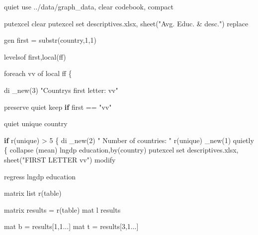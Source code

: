 \documentclass[
  12pt,
]{article}
\newenvironment{Shaded}{\begin{snugshade}}{\end{snugshade}}
\newcommand{\ControlFlowTok}[1]{\textcolor[rgb]{0.13,0.29,0.53}{\textbf{#1}}}
\newcommand{\DecValTok}[1]{\textcolor[rgb]{0.00,0.00,0.81}{#1}}
\newcommand{\FunctionTok}[1]{\textcolor[rgb]{0.00,0.00,0.00}{#1}}
\newcommand{\NormalTok}[1]{#1}
\newcommand{\OtherTok}[1]{\textcolor[rgb]{0.56,0.35,0.01}{#1}}
\newcommand{\SpecialCharTok}[1]{\textcolor[rgb]{0.00,0.00,0.00}{#1}}
\newcommand{\StringTok}[1]{\textcolor[rgb]{0.31,0.60,0.02}{#1}}
\begin{document}
\begin{Shaded}
\begin{Highlighting}[]
\NormalTok{quiet use ..}\SpecialCharTok{/}\NormalTok{data}\SpecialCharTok{/}\NormalTok{graph\_data, clear}
\NormalTok{    codebook, compact}

\NormalTok{            putexcel clear}
\NormalTok{            putexcel set descriptives.xlsx, }\FunctionTok{sheet}\NormalTok{(}\StringTok{"Avg. Educ. \& desc."}\NormalTok{) replace}
            

\NormalTok{gen first }\OtherTok{=} \FunctionTok{substr}\NormalTok{(country,}\DecValTok{1}\NormalTok{,}\DecValTok{1}\NormalTok{)}

\NormalTok{    levelsof first,}\FunctionTok{local}\NormalTok{(ff)}
    
\NormalTok{    foreach vv of local ff \{}
    
\NormalTok{        di }\FunctionTok{\_new}\NormalTok{(}\DecValTok{3}\NormalTok{) }\StringTok{"Country\textquotesingle{}s first letter: \textasciigrave{}vv\textquotesingle{}"}
        
\NormalTok{        preserve}
\NormalTok{        quiet keep }\ControlFlowTok{if}\NormalTok{ first }\SpecialCharTok{==} \StringTok{"\textasciigrave{}vv\textquotesingle{}"}
        
\NormalTok{        quiet unique country}
            
            \ControlFlowTok{if} \FunctionTok{r}\NormalTok{(unique) }\SpecialCharTok{\textgreater{}} \DecValTok{5}\NormalTok{ \{}
\NormalTok{            di }\FunctionTok{\_new}\NormalTok{(}\DecValTok{2}\NormalTok{) }\StringTok{"    Number of countries:    "} \FunctionTok{r}\NormalTok{(unique) }\FunctionTok{\_new}\NormalTok{(}\DecValTok{1}\NormalTok{)}
\NormalTok{            quietly \{}
                \FunctionTok{collapse}\NormalTok{ (mean) lngdp education,}\FunctionTok{by}\NormalTok{(country)}
\NormalTok{                    putexcel set descriptives.xlsx, }\FunctionTok{sheet}\NormalTok{(}\StringTok{"FIRST LETTER \textasciigrave{}vv\textquotesingle{}"}\NormalTok{) modify}
                    
\NormalTok{                    regress lngdp education}
                        
\NormalTok{                            matrix list }\FunctionTok{r}\NormalTok{(table)}
                        
\NormalTok{                        matrix results }\OtherTok{=} \FunctionTok{r}\NormalTok{(table)}
\NormalTok{                            mat l results}
                        
\NormalTok{                        mat b }\OtherTok{=}\NormalTok{ results[}\DecValTok{1}\NormalTok{,}\DecValTok{1}\NormalTok{...]}\StringTok{\textquotesingle{}}
\StringTok{                        mat t = results[3,1...]\textquotesingle{}}
                        

\end{Highlighting}
\end{Shaded}
\end{document}
